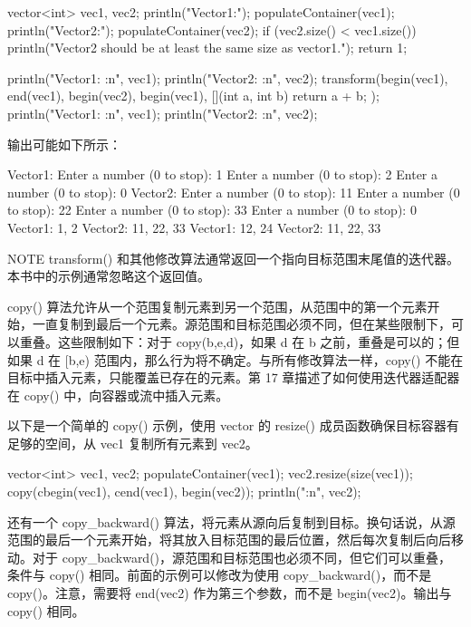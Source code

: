 \begin{cpp}
vector<int> vec1, vec2;
println("Vector1:"); populateContainer(vec1);
println("Vector2:"); populateContainer(vec2);
if (vec2.size() < vec1.size())
{
    println("Vector2 should be at least the same size as vector1.");
    return 1;
}

println("Vector1: {:n}", vec1);
println("Vector2: {:n}", vec2);
transform(begin(vec1), end(vec1), begin(vec2), begin(vec1),
    [](int a, int b){ return a + b; });
println("Vector1: {:n}", vec1);
println("Vector2: {:n}", vec2);
\end{cpp}

输出可能如下所示：

\begin{shell}
Vector1:
Enter a number (0 to stop): 1
Enter a number (0 to stop): 2
Enter a number (0 to stop): 0
Vector2:
Enter a number (0 to stop): 11
Enter a number (0 to stop): 22
Enter a number (0 to stop): 33
Enter a number (0 to stop): 0
Vector1: 1, 2
Vector2: 11, 22, 33
Vector1: 12, 24
Vector2: 11, 22, 33
\end{shell}

\begin{myNotic}{NOTE}
transform() 和其他修改算法通常返回一个指向目标范围末尾值的迭代器。本书中的示例通常忽略这个返回值。
\end{myNotic}


copy() 算法允许从一个范围复制元素到另一个范围，从范围中的第一个元素开始，一直复制到最后一个元素。源范围和目标范围必须不同，但在某些限制下，可以重叠。这些限制如下：对于 copy(b,e,d)，如果 d 在 b 之前，重叠是可以的；但如果 d 在 [b,e) 范围内，那么行为将不确定。与所有修改算法一样，copy() 不能在目标中插入元素，只能覆盖已存在的元素。第 17 章描述了如何使用迭代器适配器在 copy() 中，向容器或流中插入元素。

以下是一个简单的 copy() 示例，使用 vector 的 resize() 成员函数确保目标容器有足够的空间，从 vec1 复制所有元素到 vec2。

\begin{cpp}
vector<int> vec1, vec2;
populateContainer(vec1);
vec2.resize(size(vec1));
copy(cbegin(vec1), cend(vec1), begin(vec2));
println("{:n}", vec2);
\end{cpp}

还有一个 copy\_backward() 算法，将元素从源向后复制到目标。换句话说，从源范围的最后一个元素开始，将其放入目标范围的最后位置，然后每次复制后向后移动。对于 copy\_backward()，源范围和目标范围也必须不同，但它们可以重叠，条件与 copy() 相同。前面的示例可以修改为使用 copy\_backward()，而不是 copy()。注意，需要将 end(vec2) 作为第三个参数，而不是 begin(vec2)。输出与 copy() 相同。

